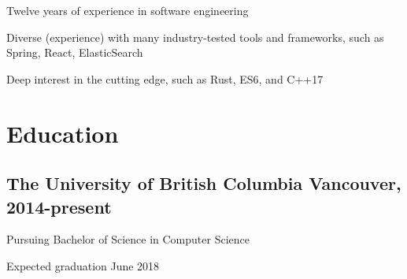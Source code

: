\documentclass[letterpaper]{article}
\newcommand{\subtitle}{\normalfont\sffamily\color{black}\footnotesize}
\begin{document}
Twelve years of experience in software engineering

Diverse (experience) with many industry-tested tools and frameworks, such as
Spring, React, ElasticSearch

Deep interest in the cutting edge, such as Rust, ES6, and C++17

\section*{Education}

\subsection*{The University of British Columbia \subtitle Vancouver,
  2014-present}

Pursuing Bachelor of Science in Computer Science

Expected graduation June 2018
\end{document}
